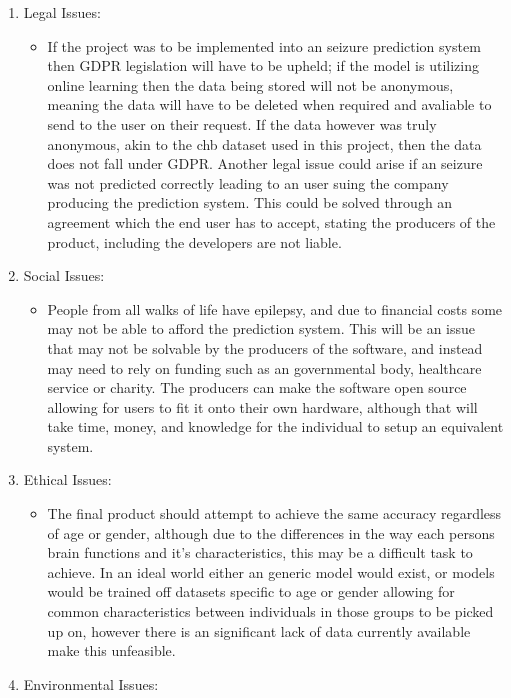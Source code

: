 \documentclass[12pt]{article}
\begin{document}
\begin{enumerate}
    \item Legal Issues:
    \begin{itemize}
        \item If the project was to be implemented into an seizure prediction system then GDPR legislation will have to be upheld; if the model is utilizing online learning then the data being stored will not be anonymous, meaning the data will have to be deleted when required and avaliable to send to the user on their request. If the data however was truly anonymous, akin to the \acrshort{chb} dataset used in this project, then the data does not fall under GDPR.
        Another legal issue could arise if an seizure was not predicted correctly leading to an user suing the company producing the prediction system. This could be solved through an agreement which the end user has to accept, stating the producers of the product, including the developers are not liable.
    \end{itemize}
    \item Social Issues:
    \begin{itemize}
    	 \item People from all walks of life have epilepsy, and due to financial costs some may not be able to afford the prediction system. This will be an issue that may not be solvable by the producers of the software, and instead may need to rely on funding such as an governmental body, healthcare service or charity. The producers can make the software open source allowing for users to fit it onto their own hardware, although that will take time, money, and knowledge for the individual to setup an equivalent system. 
    \end{itemize}
        \item Ethical Issues:
    \begin{itemize}
    	 \item The final product should attempt to achieve the same accuracy regardless of age or gender, although due to the differences in the way each persons brain functions and it's characteristics, this may be a difficult task to achieve. In an ideal world either an generic model would exist, or models would be trained off datasets specific to age or gender allowing for common characteristics between individuals in those groups to be picked up on, however there is an significant lack of data currently available make this unfeasible. 
    \end{itemize}
        \item Environmental Issues:

\end{enumerate}
\end{document}
